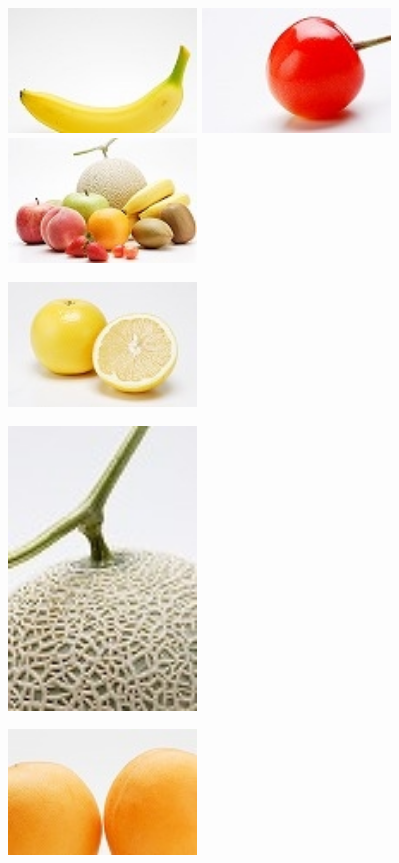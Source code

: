 \documentclass{jsarticle}
\begin{document}
\includegraphics[width=5cm]{banana.jpg} \includegraphics[width=5cm]{cherry.jpg} \includegraphics[width=5cm]{fruits.jpg}

\includegraphics[width=5cm]{grapefruits.jpg}

\includegraphics[width=5cm]{melon.jpg}

\includegraphics[width=5cm]{orange.jpg}
\end{document}
